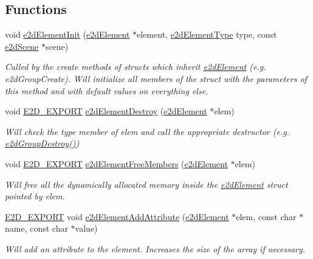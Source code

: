 \subsection*{Functions}
\begin{DoxyCompactItemize}
\item 
void \hyperlink{group__e2dElement_ga8734d10ef40a380dfc51bfe1790a92a7}{e2d\-Element\-Init} (\hyperlink{structe2dElement}{e2d\-Element} $\ast$element, \hyperlink{group__e2dElement_ga9bc8cfdec08c7e9069fc707ee456fd38}{e2d\-Element\-Type} type, const \hyperlink{structe2dScene}{e2d\-Scene} $\ast$scene)
\begin{DoxyCompactList}\small\item\em Called by the create methods of structs which inherit \hyperlink{structe2dElement}{e2d\-Element} (e.\-g. e2d\-Group\-Create). Will initialize all members of the struct with the parameters of this method and with default values on everything else. \end{DoxyCompactList}\item 
void \hyperlink{Ez2DS_8h_a9f14e9cb869e1a85fdaba03afcca0df9}{E2\-D\-\_\-\-E\-X\-P\-O\-R\-T} \hyperlink{group__e2dElement_ga2fdc3435e0e1ac9d1e1f0b330d9539fa}{e2d\-Element\-Destroy} (\hyperlink{structe2dElement}{e2d\-Element} $\ast$elem)
\begin{DoxyCompactList}\small\item\em Will check the type member of elem and call the appropriate destructor (e.\-g. \hyperlink{group__e2dGroup_gae2d96b65c911168dd57442f75c632063}{e2d\-Group\-Destroy()}) \end{DoxyCompactList}\item 
void \hyperlink{Ez2DS_8h_a9f14e9cb869e1a85fdaba03afcca0df9}{E2\-D\-\_\-\-E\-X\-P\-O\-R\-T} \hyperlink{group__e2dElement_ga5c3a7d29f41609686a3a455bad6ef7c9}{e2d\-Element\-Free\-Members} (\hyperlink{structe2dElement}{e2d\-Element} $\ast$elem)
\begin{DoxyCompactList}\small\item\em Will free all the dynamically allocated memory inside the \hyperlink{structe2dElement}{e2d\-Element} struct pointed by elem. \end{DoxyCompactList}\item 
\hyperlink{Ez2DS_8h_a9f14e9cb869e1a85fdaba03afcca0df9}{E2\-D\-\_\-\-E\-X\-P\-O\-R\-T} void \hyperlink{group__e2dElement_ga8a9021ff786f5fe61536d1c25ff0e377}{e2d\-Element\-Add\-Attribute} (\hyperlink{structe2dElement}{e2d\-Element} $\ast$elem, const char $\ast$name, const char $\ast$value)
\begin{DoxyCompactList}\small\item\em Will add an attribute to the element. Increases the size of the array if necessary. \end{DoxyCompactList}\item 

\end{DoxyCompactItemize}
